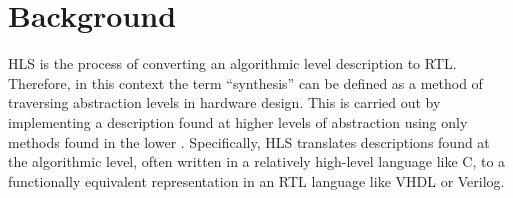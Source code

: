 \documentclass[11pt,journal,compsoc, onecolumn]{IEEEtran}
\begin{document}
\section{Background}

HLS is the process of converting an algorithmic level description to RTL. Therefore, in this context the term  ``synthesis'' can be defined as a method of traversing abstraction levels in hardware design. This is carried out by implementing a description found at higher levels of abstraction using only methods found in the lower \cite{churtl}. Specifically, HLS translates descriptions found at the algorithmic level, often written in a relatively high-level language like C, to a functionally equivalent representation in an RTL language like VHDL or Verilog.
\end{document}
